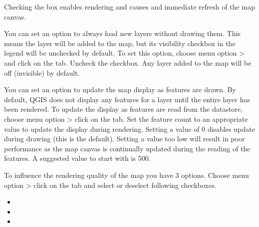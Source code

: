 Checking the  box enables rendering and causes and immediate
refresh of the map canvas.

\label{label_settinglayer}

You can set an option to always load new layers without drawing them. This
means the layer will be added to the map, but its visibility checkbox in the
legend will be unchecked by default. To set this option, choose
menu option  >  and click on the
 tab. Uncheck the  checkbox. Any layer added to the map will be off (invisible) by
default.

%
%

\label{label_updatemap}

You can set an option to update the map display as features are drawn. By
default, QGIS does not display any features for a layer until the entire
layer has been rendered. To update the display as features are read from the
datastore, choose menu option  > 
click on the  tab. Set the feature count to an
appropriate value to update the display during rendering. Setting a value of 0
disables update during drawing (this is the default). Setting a value too low
will result in poor performance as the map canvas is continually updated
during the reading of the features. A suggested value to start with is 500. 

\label{label_renderquality}

To influence the rendering quality of the map you have 3 options. Choose menu 
option  >  click on the 
 tab and select or deselect following checkboxes.

\begin{itemize}
\item {}
\item {}
\item {}
\end{itemize}


